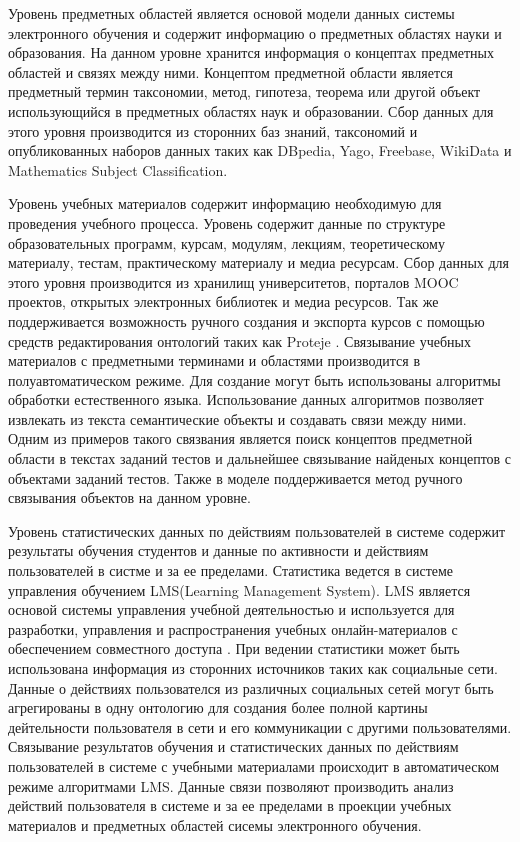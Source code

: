 Уровень предметных областей является основой модели данных системы электронного обучения и содержит информацию о предметных областях науки и образования. На данном уровне хранится информация о концептах предметных областей и связях между ними. Концептом предметной области является предметный термин таксономии, метод, гипотеза, теорема или другой объект использующийся в предметных областях наук и образовании. Сбор данных для этого уровня производится из сторонних баз знаний, таксономий и опубликованных наборов данных таких как DBpedia, Yago, Freebase, WikiData и Mathematics Subject Classification. 

Уровень учебных материалов содержит информацию необходимую для проведения учебного процесса. Уровень содержит данные по структуре  образовательных программ, курсам, модулям, лекциям, теоретическому материалу, тестам, практическому материалу и медиа ресурсам. Сбор данных для этого уровня производится из хранилищ университетов, порталов MOOC проектов, открытых электронных библиотек и медиа ресурсов. Так же поддерживается возможность ручного создания и экспорта курсов с помощью средств редактирования онтологий таких как Proteje \cite{jain2013ontology}. Связывание учебных материалов с предметными терминами и областями производится в полуавтоматическом режиме. Для создание могут быть использованы алгоритмы обработки естественного языка. Использование данных алгоритмов позволяет извлекать из текста семантические объекты и создавать связи между ними. Одним из примеров такого связвания является поиск концептов предметной области в текстах заданий тестов и дальнейшее связывание найденых концептов с объектами заданий тестов. Также в моделе поддерживается метод ручного связывания объектов на данном уровне.

Уровень статистических данных по действиям пользователей в системе содержит результаты обучения студентов и  данные по активности и действиям пользователей в систме и за ее пределами. Статистика ведется в системе управления обучением LMS(Learning Management System). LMS является основой системы управления учебной деятельностью и используется для разработки, управления и распространения учебных онлайн-материалов с обеспечением совместного доступа \cite{mahnegar2012learning}. При ведении статистики может быть использована информация из сторонних источников таких как социальные сети. Данные о действиях пользователся из различных социальных сетей могут быть агрегированы в одну онтологию для создания более полной картины дейтельности пользователя в сети и его коммуникации с другими пользователями. Связывание результатов обучения и статистических данных по действиям пользователей в системе с учебными материалами происходит в автоматическом режиме алгоритмами LMS. Данные связи позволяют производить анализ действий пользователя в системе и за ее пределами в проекции учебных материалов и предметных областей сисемы электронного обучения.


